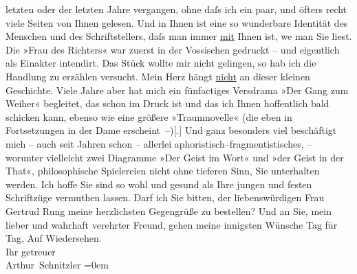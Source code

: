 \begin{ledgroupsized}[t]{13cm}
               letzten oder der letzten Jahre vergangen, ohne daſs ich ein paar, und öfters recht
               viele Seiten von Ihnen gelesen. Und in Ihnen ist eine so wunder{\pb}bare Identität des Menschen und des
               Schriftstellers, daſs man immer \uline{mit} Ihnen ist, we{\geminationn} man Sie liest.\pend
           \pstart
           Die »Frau des Richters« war zuerst in der Vossischen gedruckt – und eigentlich als Einakter
               intendirt. Das Stück wollte mir nicht gelingen, so hab ich die Handlung zu erzählen
               versucht. Mein Herz hängt \uline{nicht} an dieser kleinen
               Geschichte. Viele Jahre aber hat mich ein fünfactiges Versdrama »Der Gang zum Weiher« begleitet, das schon im Druck ist und das
               ich Ihnen hoffentlich bald schicken kann, ebenso wie eine größere »Traumnovelle« (die eben in Fortsetzungen in der
                  Dame erscheint –){[}.{]}{ }{\pb}Und ganz besonders viel beschäftigt mich – auch
               seit Jahren schon – allerlei aphoristisch–fragmentistisches, – worunter vielleicht
               zwei Diagramme »Der Geist im Wort« und »der Geist in
                  der That«, philosophische Spielereien nicht ohne tieferen Sinn, Sie
               unterhalten werden.\pend
           \pstart
           Ich hoffe Sie sind so wohl und gesund als Ihre jungen und festen Schriftzüge
               vermuthen lassen. Darf ich Sie bitten, der liebenswürdigen Frau Gertrud Rung meine herzlichsten Gegengrüße zu bestellen? Und an
               Sie, mein lieber und wahrhaft verehrter Freund, gehen meine innigsten Wünsche {\pb}Tag für Tag.\pend
           \pstart
           Auf Wiedersehen.{\\[\baselineskip]}Ihr getreuer{\\[\baselineskip]}\spacefill\mbox{Arthur Schnitzler}\pend
           \leftskip=0em{}
         
         \endnumbering{}\end{ledgroupsized}  \newcommand{\dateiname}{L02465}\newcommand{\titel}{Arthur Schnitzler an Georg Brandes, 3. 1. 1926}\newcommand{\editorInnen}{Martin Anton Müller und Gerd-Hermann Susen}
      